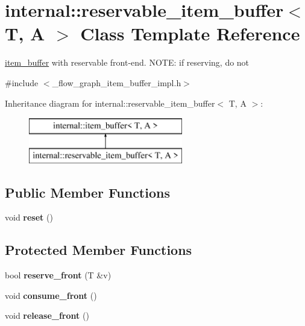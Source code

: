 \hypertarget{classinternal_1_1reservable__item__buffer}{}\section{internal\+:\+:reservable\+\_\+item\+\_\+buffer$<$ T, A $>$ Class Template Reference}
\label{classinternal_1_1reservable__item__buffer}


\hyperlink{classinternal_1_1item__buffer}{item\+\_\+buffer} with reservable front-\/end. N\+O\+T\+E\+: if reserving, do not  




{\ttfamily \#include $<$\+\_\+flow\+\_\+graph\+\_\+item\+\_\+buffer\+\_\+impl.\+h$>$}

Inheritance diagram for internal\+:\+:reservable\+\_\+item\+\_\+buffer$<$ T, A $>$\+:\begin{figure}[H]
\begin{center}
\leavevmode
\includegraphics[height=2.000000cm]{classinternal_1_1reservable__item__buffer}
\end{center}
\end{figure}
\subsection*{Public Member Functions}
\begin{DoxyCompactItemize}
\item 
\hypertarget{classinternal_1_1reservable__item__buffer_a0f164e130a78064b8f3251346030dbf4}{}void {\bfseries reset} ()\label{classinternal_1_1reservable__item__buffer_a0f164e130a78064b8f3251346030dbf4}

\end{DoxyCompactItemize}
\subsection*{Protected Member Functions}
\begin{DoxyCompactItemize}
\item 
\hypertarget{classinternal_1_1reservable__item__buffer_a626c698dc94dc085569300f7234cc4e7}{}bool {\bfseries reserve\+\_\+front} (T \&v)\label{classinternal_1_1reservable__item__buffer_a626c698dc94dc085569300f7234cc4e7}

\item 
\hypertarget{classinternal_1_1reservable__item__buffer_af3b66b1c95176b5642840db7988518f0}{}void {\bfseries consume\+\_\+front} ()\label{classinternal_1_1reservable__item__buffer_af3b66b1c95176b5642840db7988518f0}

\item 
\hypertarget{classinternal_1_1reservable__item__buffer_a44b718b1ff84ea5e8d13870715189eab}{}void {\bfseries release\+\_\+front} ()\label{classinternal_1_1reservable__item__buffer_a44b718b1ff84ea5e8d13870715189eab}

\end{DoxyCompactItemize}
